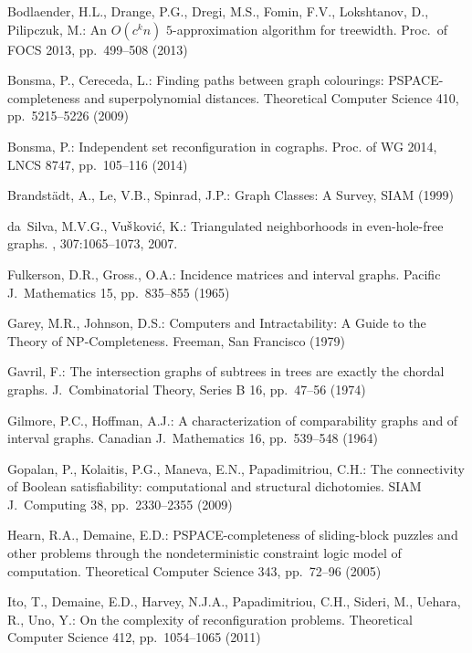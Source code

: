 \documentclass{llncs}
\begin{document}

\begin{thebibliography}{99}


Bodlaender, H.L., Drange, P.G., Dregi, M.S., Fomin, F.V., Lokshtanov, D., Pilipczuk, M.:
An $O(c^k n)$ $5$-approximation algorithm for treewidth.
Proc.\ of FOCS 2013, pp.~499--508 (2013)

Bonsma, P., Cereceda, L.: 
Finding paths between graph colourings: PSPACE-completeness and superpolynomial distances. 
Theoretical Computer Science 
410, pp.~5215--5226 (2009)  

Bonsma, P.: 
Independent set reconfiguration in cographs. 
Proc. of WG 2014, LNCS 8747, pp.~105--116 (2014)

Brandst\"adt, A., Le, V.B., Spinrad, J.P.:
Graph Classes: A Survey, SIAM (1999)

da~Silva, M.V.G., Vu${\rm \check{s}}$kovi\'c, K.:
\newblock Triangulated neighborhoods in even-hole-free graphs.
, 307:1065--1073, 2007.

Fulkerson, D.R., Gross., O.A.:
Incidence matrices and interval graphs.
Pacific J.~Mathematics 15, pp.~835--855 (1965)

Garey, M.R., Johnson, D.S.:
Computers and Intractability: A Guide to the Theory of {NP}-Completeness.
Freeman, San Francisco (1979)

Gavril, F.:
The intersection graphs of subtrees in trees are exactly the chordal graphs.
J.~Combinatorial Theory, Series B 16, pp.~47--56 (1974)

Gilmore, P.C., Hoffman, A.J.:
A characterization of comparability graphs and of interval graphs.
Canadian J.~Mathematics 16, pp.~539--548 (1964)

Gopalan, P., Kolaitis, P.G., Maneva, E.N., Papadimitriou, C.H.:
The connectivity of Boolean satisfiability: computational and structural dichotomies.
SIAM J.~Computing 38, pp.~2330--2355 (2009)  

Hearn, R.A., Demaine, E.D.: 
PSPACE-completeness of sliding-block puzzles and other problems through the nondeterministic constraint logic model of computation. 
Theoretical Computer Science 
343, pp.~72--96 (2005) 


Ito, T., Demaine, E.D., Harvey, N.J.A., Papadimitriou, C.H., Sideri, M., Uehara, R., Uno, Y.: 
On the complexity of reconfiguration problems.
Theoretical Computer Science 
412, pp.~1054--1065 (2011)


\end{thebibliography}
\end{document}
